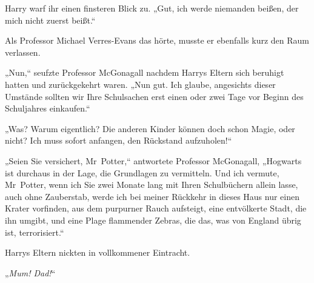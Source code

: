 Harry warf ihr einen finsteren Blick zu. „Gut, ich werde niemanden beißen, der mich nicht zuerst beißt.“

Als Professor Michael Verres-Evans das hörte, musste er ebenfalls kurz den Raum verlassen.

„Nun,“ seufzte Professor McGonagall nachdem Harrys Eltern sich beruhigt hatten und zurückgekehrt waren. „Nun gut. Ich glaube, angesichts dieser Umstände sollten wir Ihre Schulsachen erst einen oder zwei Tage vor Beginn des Schuljahres einkaufen.“

„Was? Warum eigentlich? Die anderen Kinder können doch schon Magie, oder nicht? Ich muss sofort anfangen, den Rückstand aufzuholen!“

„Seien Sie versichert, Mr~Potter,“ antwortete Professor McGonagall, „Hogwarts ist durchaus in der Lage, die Grundlagen zu vermitteln. Und ich vermute, Mr~Potter, wenn ich Sie zwei Monate lang mit Ihren Schulbüchern allein lasse, auch ohne Zauberstab, werde ich bei meiner Rückkehr in dieses Haus nur einen Krater vorfinden, aus dem purpurner Rauch aufsteigt, eine entvölkerte Stadt, die ihn umgibt, und eine Plage flammender Zebras, die das, was von England übrig ist, terrorisiert.“

Harrys Eltern nickten in vollkommener Eintracht.

„\emph{Mum! Dad!}“

